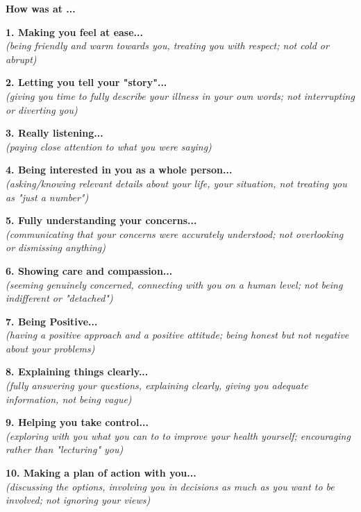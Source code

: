 \begin{small}

\begin{tcolorbox}[boxrule=1pt]
    \begin{center}
         {\large \textbf{How was \sysname at ...}}
    \end{center}
   
\end{tcolorbox}

\vspace{1em}


\noindent \textbf{1. Making you feel at ease...} \\
\textit{(being friendly and warm towards you, treating you with respect; not cold or abrupt)}
\ratingTable

\noindent \textbf{2. Letting you tell your "story"...} \\
\textit{(giving you time to fully describe your illness in your own words; not interrupting or diverting you)}
\ratingTable

\noindent \textbf{3. Really listening...} \\
\textit{(paying close attention to what you were saying)}
\ratingTable

\noindent \textbf{4. Being interested in you as a whole person...} \\ 
\textit{(asking/knowing relevant details about your life, your situation, not treating you as "just a number")}
\ratingTable


\noindent \textbf{5. Fully understanding your concerns...} \\
\textit{(communicating that your concerns were accurately understood; not overlooking or dismissing anything)}
\ratingTable

\noindent \textbf{6. Showing care and compassion...} \\
\textit{(seeming genuinely concerned, connecting with you on a human level; not being indifferent or "detached")}
\ratingTable

\noindent \textbf{7. Being Positive...} \\
\textit{(having a positive approach and a positive attitude; being honest but not negative about your problems)}
\ratingTable

\noindent \textbf{8. Explaining things clearly...} \\
\textit{(fully answering your questions, explaining clearly, giving you adequate information, not being vague)}
\ratingTable

\noindent \textbf{9. Helping you take control...} \\
\textit{(exploring with you what you can to to improve your health yourself; encouraging rather than "lecturing" you)}
\ratingTable

\noindent \textbf{10. Making a plan of action with you...} \\
\textit{(discussing the options, involving you in decisions as much as you want to be involved; not ignoring your views)}
\ratingTable
\end{small}

